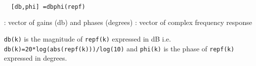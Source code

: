\begin{mandesc}
   \\ %
\end{mandesc}
\begin{calling_sequence}
\begin{verbatim}
  [db,phi] =dbphi(repf)  
\end{verbatim}
\end{calling_sequence}
\begin{parameters}
  \begin{varlist}
    : vector of gains (db) and phases (degrees)
    : vector of complex frequency response
  \end{varlist}
\end{parameters}
\begin{mandescription}
  \verb!db(k)! is the magnitude of \verb!repf(k)! expressed in dB i.e.
  \verb!db(k)=20*log(abs(repf(k)))/log(10)! and \verb!phi(k)! is the phase
  of \verb!repf(k)! expressed in degrees.
\end{mandescription}
\begin{manseealso}
     
\end{manseealso}
